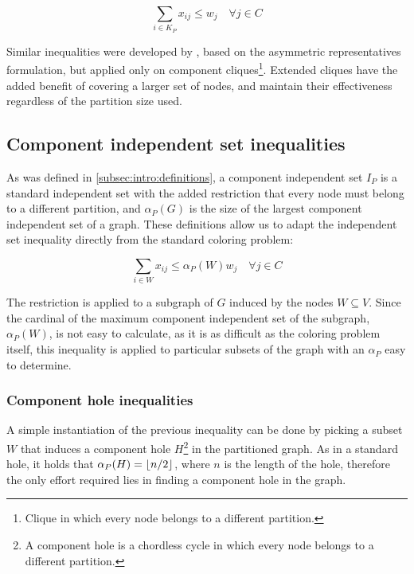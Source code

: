 \begin{equation}
\label{ineq:extendedclique}
\sum_{i \in K_P} x_{ij} \leq w_{j} \quad \forall j \in C
\end{equation}

Similar inequalities were developed by \cite{frota2010branch}, based on the asymmetric representatives formulation, but applied only on component cliques\footnote{Clique in which every node belongs to a different partition.}. Extended cliques have the added benefit of covering a larger set of nodes, and maintain their effectiveness regardless of the partition size used.

\subsection{Component independent set inequalities}

As was defined in \ref{subsec:intro:definitions}, a component independent set $I_P$ is a standard independent set with the added restriction that every node must belong to a different partition, and $\alpha_P(G)$ is the size of the largest component independent set of a graph. These definitions allow us to adapt the independent set inequality directly from the standard coloring problem:

\begin{equation}
\label{ineq:ciset}
\sum _{i \in W} x_{ij} \leq \alpha_P(W) w_{j} \quad \forall j \in C
\end{equation}

The restriction is applied to a subgraph of $G$ induced by the nodes $W \subseteq V$. Since the cardinal of the maximum component independent set of the subgraph, $\alpha_P(W)$, is not easy to calculate, as it is as difficult as the coloring problem itself, this inequality is applied to particular subsets of the graph with an $\alpha_P$ easy to determine.

\subsubsection*{Component hole inequalities}

A simple instantiation of the previous inequality can be done by picking a subset $W$ that induces a component hole $H$\footnote{A component hole is a chordless cycle in which every node belongs to a different partition.} in the partitioned graph. As in a standard hole, it holds that $\alpha_P(H) = \left\lfloor n / 2 \right\rfloor$, where $n$ is the length of the hole, therefore the only effort required lies in finding a component hole in the graph.

